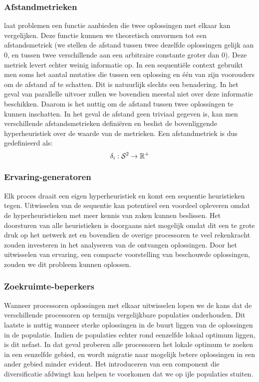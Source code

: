 \subsubsection{Afstandmetrieken}
\abhf{} laat problemen een functie aanbieden die twee oplossingen met elkaar kan vergelijken. Deze functie kunnen we theoretisch omvormen tot een afstandsmetriek (we stellen de afstand tussen twee dezelfde oplossingen gelijk aan 0, en tussen twee verschillende aan een arbitraire constante groter dan 0). Deze metriek levert echter weinig informatie op. In een sequenti\"ele context gebruikt men soms het aantal mutaties die tussen een oplossing en \'e\'en van zijn voorouders om de afstand af te schatten. Dit is natuurlijk slechts een benadering. In het geval van parallelle uitvoer zullen we bovendien meestal niet over deze informatie beschikken. Daarom is het nuttig om de afstand tussen twee oplossingen te kunnen inschatten. In het geval de afstand geen triviaal gegeven is, kan men verschillende afstandsmetrieken defini\"eren en beslist de bovenliggende hyperheuristiek over de waarde van de metrieken. Een afstandmetriek is dus gedefinieerd als:
 \begin{equation}
  \delta_i:\mathcal{S}^2\rightarrow\mathbb{R}^+
 \end{equation}
 
\subsubsection{Ervaring-generatoren}
Elk proces draait een eigen hyperheuristiek en komt een sequentie heuristieken tegen. Uitwisselen van de sequentie kan potentieel een voordeel opleveren omdat de hyperheuristieken met meer kennis van zaken kunnen beslissen. Het doorsturen van alle heuristieken is doorgaans niet mogelijk omdat dit een te grote druk op het netwerk zet en bovendien de overige processoren te veel rekenkracht zouden investeren in het analyseren van de ontvangen oplossingen. Door het uitwisselen van ervaring, een compacte voorstelling van beschouwde oplossingen, zouden we dit probleem kunnen oplossen.

\subsubsection{Zoekruimte-beperkers}
Wanneer processoren oplossingen met elkaar uitwisselen lopen we de kans dat de verschillende processoren op termijn vergelijkbare populaties onderhouden. Dit laatste is nuttig wanneer sterke oplossingen in de buurt liggen van de oplossingen in de populatie. Indien de populaties echter rond eenzelfde lokaal optimum liggen, is dit nefast. In dat geval proberen alle processoren het lokale optimum te zoeken in een eenzelfde gebied, en wordt migratie naar mogelijk betere oplossingen in een ander gebied minder evident. Het introduceren van een component die diversificatie afdwingt kan helpen te voorkomen dat we op ijle populaties stuiten.

